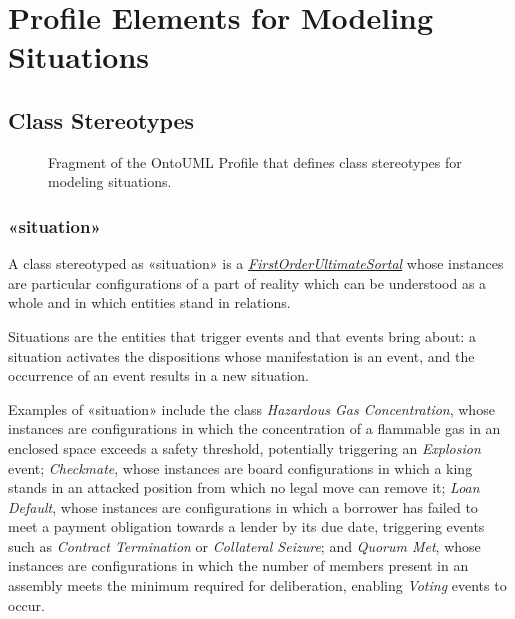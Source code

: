 \chapter{Profile Elements for Modeling Situations}
\label{chapter:profileElementsForModelingSituations}

\section{Class Stereotypes}
\label{section:situationClassStereotypes}

\begin{figure}[h]
    \centering
    
    \caption{Fragment of the OntoUML Profile that defines class stereotypes for modeling situations.}
    \label{fig:situation-classes-profile}
\end{figure}

\subsection{«situation»}
\label{stereotype:situation}

A class stereotyped as «situation» is a \hyperref[stereotype:firstOrderUltimateSortal]{\textit{FirstOrderUltimateSortal}} whose instances are particular configurations of a part of reality which can be understood as a whole and in which entities stand in relations. 

Situations are the entities that trigger events and that events bring about: a situation activates the dispositions whose manifestation is an event, and the occurrence of an event results in a new situation. 

Examples of «situation» include the class \textit{Hazardous Gas Concentration}, whose instances are configurations in which the concentration of a flammable gas in an enclosed space exceeds a safety threshold, potentially triggering an \textit{Explosion} event; \textit{Checkmate}, whose instances are board configurations in which a king stands in an attacked position from which no legal move can remove it; \textit{Loan Default}, whose instances are configurations in which a borrower has failed to meet a payment obligation towards a lender by its due date, triggering events such as \textit{Contract Termination} or \textit{Collateral Seizure}; and \textit{Quorum Met}, whose instances are configurations in which the number of members present in an assembly meets the minimum required for deliberation, enabling \textit{Voting} events to occur.

